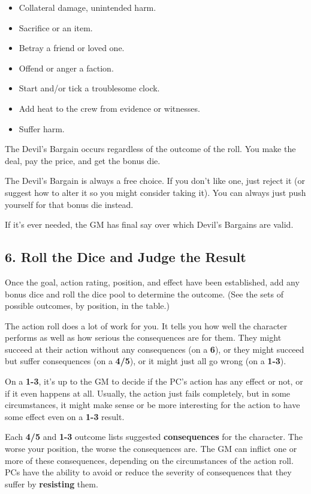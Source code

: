 \begin{itemize}
\item    Collateral damage, unintended harm.
\item    Sacrifice  or an item.
\item    Betray a friend or loved one.
\item    Offend or anger a faction.
\item    Start and/or tick a troublesome clock.
\item    Add heat to the crew from evidence or witnesses.
\item    Suffer harm.
\end{itemize}

The Devil’s Bargain occurs regardless of the outcome of the roll. You make the deal, pay the price, and get the bonus die.

The Devil’s Bargain is always a free choice. If you don’t like one, just reject it (or suggest how to alter it so you might consider taking it). You can always just push yourself for that bonus die instead.

If it’s ever needed, the GM has final say over which Devil’s Bargains are valid.

\subsection{6. Roll the Dice and Judge the Result}

Once the goal, action rating, position, and effect have been established, add any bonus dice and roll the dice pool to determine the outcome. (See the sets of possible outcomes, by position, in the table.)

The action roll does a lot of work for you. It tells you how well the character performs as well as how serious the consequences are for them. They might succeed at their action without any consequences (on a \textbf{6}), or they might succeed but suffer consequences (on a \textbf{4/5}), or it might just all go wrong (on a \textbf{1-3}).

On a \textbf{1-3}, it’s up to the GM to decide if the PC’s action has any effect or not, or if it even happens at all. Usually, the action just fails completely, but in some circumstances, it might make sense or be more interesting for the action to have some effect even on a \textbf{1-3} result.

Each \textbf{4/5} and \textbf{1-3} outcome lists suggested \textbf{consequences} for the character. The worse your position, the worse the consequences are. The GM can inflict one or more of these consequences, depending on the circumstances of the action roll. PCs have the ability to avoid or reduce the severity of consequences that they suffer by \textbf{resisting} them.

